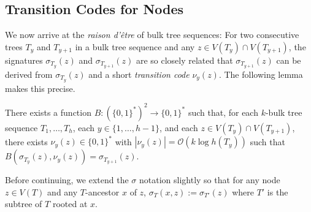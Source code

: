 \documentclass[kpfonts]{patmorin}
\newcommand{\snote}[1]{\fcolorbox{red}{yellow}{#1}}
\newcommand{\Oh}{\mathcal{O}}
\begin{document}
\subsection{Transition Codes for Nodes}

We now arrive at the \emph{raison d'être} of bulk tree sequences:  For two consecutive trees $T_y$ and $T_{y+1}$ in a bulk tree sequence and any $z\in V(T_y)\cap V(T_{y+1})$, the signatures $\sigma_{T_y}(z)$ and $\sigma_{T_{y+1}}(z)$ are so closely related that $\sigma_{T_{y+1}}(z)$ can be derived from $\sigma_{T_y}(z)$ and a short \emph{transition code} $\nu_y(z)$.  The following lemma makes this precise.

\begin{lem}
  There exists a function $B:(\{0,1\}^*)^2\to\{0,1\}^*$ such that, for each $k$-bulk tree sequence $T_1,\ldots,T_h$, each $y\in\{1,\ldots,h-1\}$, and each $z\in V(T_y)\cap V(T_{y+1})$, there exists $\nu_y(z)\in\{0,1\}^*$ with $|\nu_y(z)| = \Oh(k\log h(T_y))$ such that $B(\sigma_{T_y}(z), \nu_y(z)) = \sigma_{T_{y+1}}(z)$.
\end{lem}

Before continuing, we extend the $\sigma$ notation slightly so that for any node $z\in V(T)$ and any $T$-ancestor $x$ of $z$, $\sigma_T(x,z):=\sigma_{T'}(z)$ where $T'$ is the subtree of $T$ rooted at $x$.

\end{document}
